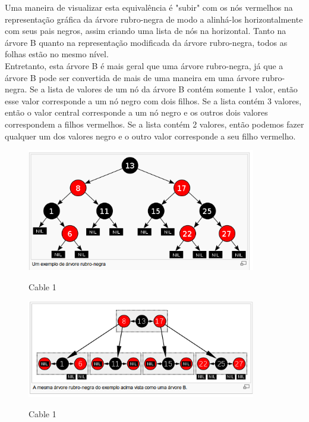 \documentclass{article}
\begin{document}
Uma maneira de visualizar esta equivalência é "subir" com os nós vermelhos na representação gráfica
da árvore rubro-negra de modo a alinhá-los horizontalmente com seus pais negros, assim criando uma
lista de nós na horizontal. Tanto na árvore B quanto na representação modificada da árvore
rubro-negra, todos as folhas estão no mesmo nível.\\

Entretanto, esta árvore B é mais geral que uma árvore rubro-negra, já que a árvore B pode ser convertida de mais de uma maneira em uma árvore rubro-negra. Se a lista de valores de um nó da árvore B contém somente 1 valor, então esse valor corresponde a um nó negro com dois filhos. Se a lista contém 3 valores, então o valor central corresponde a um nó negro e os outros dois valores correspondem a filhos vermelhos. Se a lista contém 2 valores, então podemos fazer qualquer um dos valores negro e o outro valor corresponde a seu filho vermelho.

\begin{figure}[h]
    \center
    \includegraphics[width=10cm]{imagens/rub1.png}
    \label{cable}
    \caption{Cable 1}
\end{figure}

\begin{figure}[h]
    \center
    \includegraphics[width=10cm]{imagens/rub2.png}
    \label{cable}
    \caption{Cable 1}
\end{figure}

\newpage

\subsection{}
\end{document}
